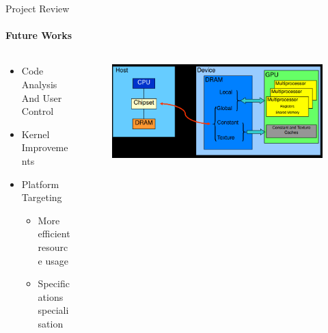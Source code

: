 	\begin{frame}[t]{Project Review}\framesubtitle{Future Works}
	\begin{columns}[T]
	\begin{column}{0.48\textwidth}
		\begin{itemize}
			\item Code Analysis And User Control
			\item Kernel Improvements
			\item Platform Targeting
			\begin{itemize}
				\item More efficient resource usage
				\item Specifications specialisation
			\end{itemize}
		\end{itemize}
	\end{column}
	\begin{column}{.48\textwidth}
      \begin{figure}
         \includegraphics[width=1\textwidth]{images/GPUMemoryClear.png}
      \end{figure}
    \end{column}
    \end{columns}
	\end{frame}